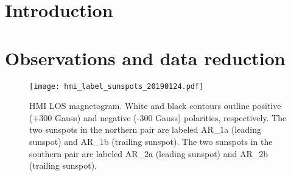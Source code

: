 




{\fontsize{16}{14}\selectfont\centering\bfseries\scshape
    }


\section{Introduction}



\clearpage
\section{Observations and data reduction}





\begin{figure}[htb!]\centering
    \texttt{[image: hmi\_label\_sunspots\_20190124.pdf]}
    \caption{
        HMI LOS magnetogram.
        White and black contours outline positive (+300 Gauss)
        and negative (-300 Gauss) polarities, respectively.
        The two sunspots in the northern pair are labeled AR\_1a (leading sunspot)
        and AR\_1b (trailing sunspot).
        The two sunspots in the southern pair are labeled AR\_2a (leading sunspot)
        and AR\_2b (trailing sunspot).
        \label{hmi}}
\end{figure}


